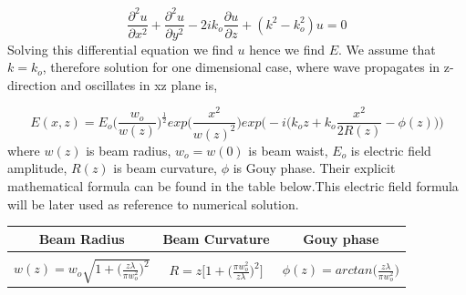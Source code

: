 \documentclass{article}
\begin{document}
	\begin{equation}
	\frac{\partial^2 u}{\partial x^2}+ \frac{\partial^2 u}{\partial y^2} - 2ik_o\frac{\partial u}{\partial z}+(k^2-k_o^2)u=0
	\end{equation}
	Solving this differential equation we find $u$ hence we find $E$. We assume that $k = k_o$, therefore solution for one dimensional case, where wave propagates in z-direction and oscillates in xz plane is,
	
	\[E(x,z)=E_o\bigg(\frac{w_o}{w(z)}\bigg)^{\frac{1}{2}}exp\bigg(\frac{x^2}{w(z)^2}\bigg)exp\bigg(-i\Big(k_oz+k_o\frac{x^2}{2R(z)}-\phi(z)\Big)\bigg)\]
	where $w(z)$ is beam radius, $w_o = w(0)$ is beam waist, $E_o$ is electric field amplitude, $R(z)$ is beam curvature, $\phi$ is Gouy phase. Their explicit mathematical formula can be found in the table below.This electric field formula will be later used as reference to numerical solution.
	

	\begin{table}[h!]
		\begin{center}
			\label{tab:table1}
			\begin{tabular}{c| c| c} %
				\textbf{Beam Radius} & \textbf{Beam Curvature} & \textbf{Gouy phase}\\
				\hline
				&&\\
				$w(z)= w_o\sqrt{1+\Big(\frac{z\lambda}{\pi w_o^2}\Big)^2}$ & $R=z\bigg[1+\Big(\frac{\pi w_o^2}{z\lambda}\Big)^2\bigg]$ & $\phi(z)=arctan\Big(\frac{z\lambda}{\pi w_o^2}\Big)$\\
			\end{tabular}
		\end{center}
	\end{table}
	
\end{document}

